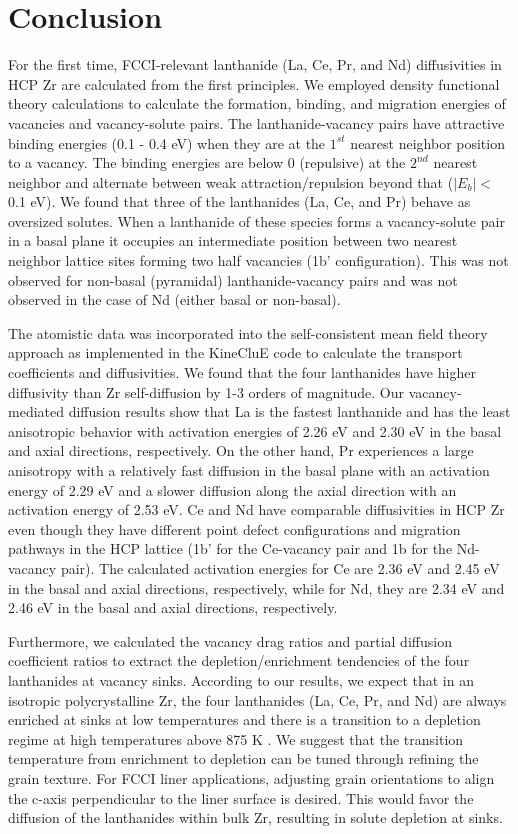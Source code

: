 \documentclass[preprint,12pt]{elsarticle}
\begin{document}
\section{Conclusion}
For the first time, FCCI-relevant lanthanide (La, Ce, Pr, and Nd) diffusivities in HCP Zr are calculated from the first principles. We employed density functional theory calculations to calculate the formation, binding, and migration energies of vacancies and vacancy-solute pairs. The lanthanide-vacancy pairs have attractive binding energies (0.1 - 0.4 eV) when they are at the $1^{st}$ nearest neighbor position to a vacancy. The binding energies are below 0 (repulsive) at the $2^{nd}$ nearest neighbor and alternate between weak attraction/repulsion beyond that ($|E_b| < $ 0.1 eV). We found that three of the lanthanides (La, Ce, and Pr) behave as oversized solutes. When a lanthanide of these species forms a vacancy-solute pair in a basal plane it occupies an intermediate position between two nearest neighbor lattice sites forming two half vacancies (1b' configuration). This was not observed for non-basal (pyramidal) lanthanide-vacancy pairs and was not observed in the case of Nd (either basal or non-basal).

The atomistic data was incorporated into the self-consistent mean field theory approach as implemented in the KineCluE code \cite{schuler_kineclue_2020} to calculate the transport coefficients and diffusivities. We found that the four lanthanides have higher diffusivity than Zr self-diffusion by 1-3 orders of magnitude. Our vacancy-mediated diffusion results show that La is the fastest lanthanide and has the least anisotropic behavior with activation energies of 2.26 eV and 2.30 eV in the basal and axial directions, respectively. On the other hand, Pr experiences a large anisotropy with a relatively fast diffusion in the basal plane with an activation energy of 2.29 eV and a slower diffusion along the axial direction with an activation energy of 2.53 eV. Ce and Nd have comparable diffusivities in HCP Zr even though they have different point defect configurations and migration pathways in the HCP lattice (1b' for the Ce-vacancy pair and 1b for the Nd-vacancy pair). The calculated activation energies for Ce are 2.36 eV and 2.45 eV in the basal and axial directions, respectively, while for Nd, they are 2.34 eV and 2.46 eV in the basal and axial directions, respectively.

Furthermore, we calculated the vacancy drag ratios and partial diffusion coefficient ratios to extract the depletion/enrichment tendencies of the four lanthanides at vacancy sinks. According to our results, we expect that in an isotropic polycrystalline Zr, the four lanthanides (La, Ce, Pr, and Nd) are always enriched at sinks at low temperatures and there is a transition to a depletion regime at high temperatures above 875 K . We suggest that the transition temperature from enrichment to depletion can be tuned through refining the grain texture. For FCCI liner applications, adjusting grain orientations to align the c-axis perpendicular to the liner surface is desired. This would favor the diffusion of the lanthanides within bulk Zr, resulting in solute depletion at sinks.
\end{document}
